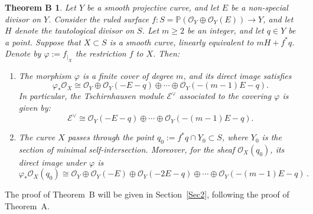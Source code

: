 \documentclass[a4paper,12pt]{amsart}
\newtheorem*{thmB}{Theorem B}
\begin{document}
\begin{thmB}\label{thmBRef}
Let $Y$ be a smooth projective curve, and let $E$ be a non-special divisor on $Y$. Consider the ruled surface $f : S = \mathbb{P} (\mathcal{O}_Y \oplus \mathcal{O}_Y (E)) \to Y$, and let $H$ denote the tautological divisor on $S$. Let $m \geq 2$ be an integer, and let $q \in Y$ be a point. Suppose that $X \subset S$ is a smooth curve, linearly equivalent to $mH + f^{\ast} q$. Denote by $\varphi := f_{|_X}$ the restriction $f$ to $X$. Then:
\begin{enumerate}[label=(\roman*), leftmargin=*, font=\rmfamily]
 \item The morphism $\varphi$ is a finite cover of degree $m$, and its direct image satisfies
 \begin{equation*}\label{ThmB_Decomp}
  \varphi_{\ast} \mathcal{O}_X \cong \mathcal{O}_Y \oplus \mathcal{O}_Y (-E-q)  \oplus \cdots \oplus \mathcal{O}_Y (-(m-1)E-q) .
 \end{equation*}
In particular, the Tschirnhausen module $\mathcal{E}^{\vee}$ associated to the covering $\varphi$ is given by:
\[
 \mathcal{E}^{\vee} \cong \mathcal{O}_Y (-E-q)  \oplus \cdots \oplus \mathcal{O}_Y (-(m-1)E-q) .
\]

 \item The curve $X$ passes through the point $q_0 := f^{\ast} q \cap Y_0 \subset S$, where $Y_0$ is the section of minimal self-intersection. Moreover, for the sheaf $\mathcal{O}_X (q_0)$, its direct image under $\varphi$ is
 \begin{equation*}\label{ThmB_Decomp_q}
 \varphi_{\ast} \mathcal{O}_X (q_0) \cong  \mathcal{O}_Y \oplus \mathcal{O}_Y (-E) \oplus \mathcal{O}_Y (-2E-q)  \oplus \cdots \oplus \mathcal{O}_Y (-(m-1)E-q) \, .
 \end{equation*}
\end{enumerate}
\end{thmB}

\medskip

The proof of \textnormal{Theorem~B} will be given  in Section~\ref{Sec2}, following the proof of \textnormal{Theorem~A}.
\end{document}
